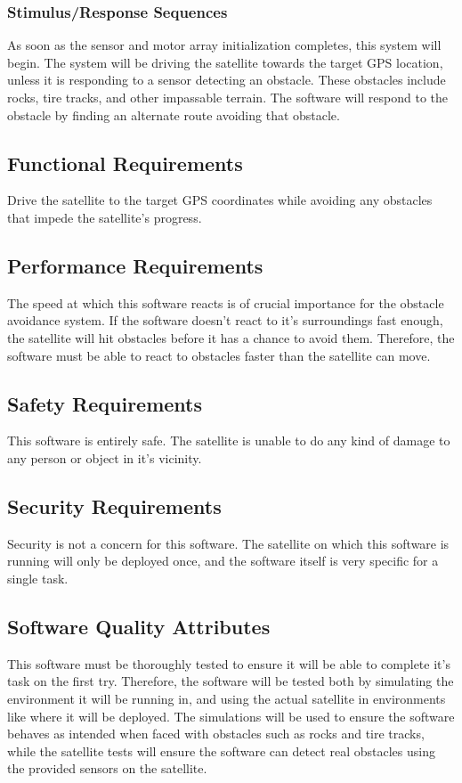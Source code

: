 \documentclass[10pt,onecolumn,draftclsnofoot,document]{IEEEtran}
\begin{document}
\subsubsection{Stimulus/Response Sequences}
As soon as the sensor and motor array initialization completes, this system will begin. The system will be driving the satellite towards the target GPS location, unless it is responding to a sensor detecting an obstacle. These obstacles include rocks, tire tracks, and other impassable terrain. The software will respond to the obstacle by finding an alternate route avoiding that obstacle. 

\subsection{Functional Requirements}
Drive the satellite to the target GPS coordinates while avoiding any obstacles that impede the satellite's progress.

\subsection{Performance Requirements}
The speed at which this software reacts is of crucial importance for the obstacle avoidance system. If the software doesn't react to it's surroundings fast enough, the satellite will hit obstacles before it has a chance to avoid them. Therefore, the software must be able to react to obstacles faster than the satellite can move.

\subsection{Safety Requirements}
This software is entirely safe. The satellite is unable to do any kind of damage to any person or object in it's vicinity.

\subsection{Security Requirements}
Security is not a concern for this software. The satellite on which this software is running will only be deployed once, and the software itself is very specific for a single task.

\subsection{Software Quality Attributes}
This software must be thoroughly tested to ensure it will be able to complete it's task on the first try. Therefore, the software will be tested both by simulating the environment it will be running in, and using the actual satellite in environments like where it will be deployed. The simulations will be used to ensure the software behaves as intended when faced with obstacles such as rocks and tire tracks, while the satellite tests will ensure the software can detect real obstacles using the provided sensors on the satellite.
\end{document}
